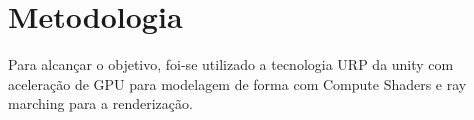 \section{Metodologia}
\label{sec:metodologia}

Para alcançar o objetivo, foi-se utilizado a tecnologia URP da unity com aceleração de GPU para modelagem de forma com Compute Shaders e ray marching para a renderização.
